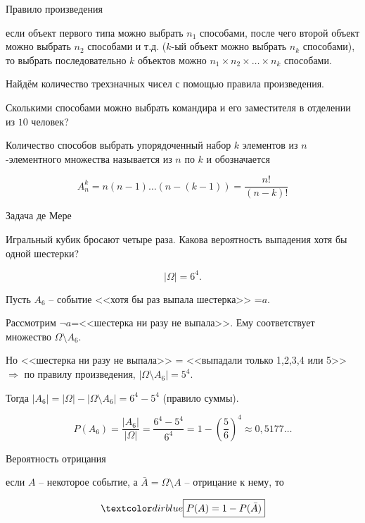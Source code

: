 \begin{frame}{Правило произведения}


 если объект первого типа можно выбрать $n_1$ способами, после чего второй объект можно выбрать $n_2$ способами и т.д.
($k$-ый объект можно выбрать $n_k$ способами), то выбрать последовательно $k$ объектов можно $n_1 \times n_2 \times \ldots \times n_k$ способами.

\exmpl Найдём количество трехзначных чисел с помощью правила
произведения.

\exmpl Сколькими способами можно выбрать командира и его заместителя в отделении из $10$ человек?

 Количество способов выбрать упорядоченный набор $k$ элементов из $n$-элементного множества называется  из $n$ по $k$ и обозначается

$$A_n^k=n(n-1)\dots(n-(k-1))=\frac{n!}{(n-k)!}$$


\end{frame}


\begin{frame}{Задача де Мере}

\exmpl Игральный кубик бросают четыре раза. Какова вероятность выпадения  хотя бы одной шестерки?

$$|\Omega|=6^4.$$

Пусть $A_6$ -- событие <<хотя бы раз выпала шестерка>> =$a$.

Рассмотрим $\neg a$=<<шестерка ни разу не выпала>>. Ему соответствует множество $\Omega\setminus A_6$.

Но <<шестерка ни разу не выпала>> = <<выпадали только 1,2,3,4 или 5>> $\Longrightarrow$ по правилу произведения, $|\Omega\setminus A_6|=5^4$.

Тогда $|A_6|=|\Omega|-|\Omega\setminus A_6|=6^4-5^4$ (правило суммы).

$$P(A_6)=\dfrac{|A_6|}{|\Omega|}=\dfrac{6^4-5^4}{6^4}=1-\left(\dfrac{5}{6}\right)^4\approx \boxed{0,5177\ldots}$$

\end{frame}


\begin{frame}{Вероятность отрицания}

 если $A$ -- некоторое событие, а $\bar{A}=\Omega\setminus A$ -- отрицание к нему, то 

$$\acc{\boxed{P(A)=1-P(\bar{A})}}$$


\end{frame}



